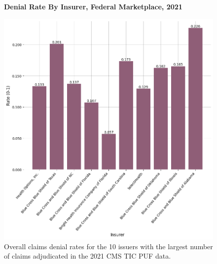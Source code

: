 \documentclass[12pt, a4paper,twoside]{report}
\theoremstyle{plain} %
\theoremstyle{definition} %
\theoremstyle{remark} %
\numberwithin{equation}{chapter}
\begin{document}
	
		\begin{figure}[h!]
			\centering
			\textbf{Denial Rate By Insurer, Federal Marketplace, 2021}\par\medskip
			\includegraphics[width=\columnwidth]{images/cms_puf/denial_rate_by_insurer.png}
			\caption{Overall claims denial rates for the 10 issuers with the largest number of claims adjudicated in the 2021 CMS TIC PUF data.}
			\label{fedinsurerdenialrates}
		\end{figure}
	
		\clearpage
		
\end{document}
